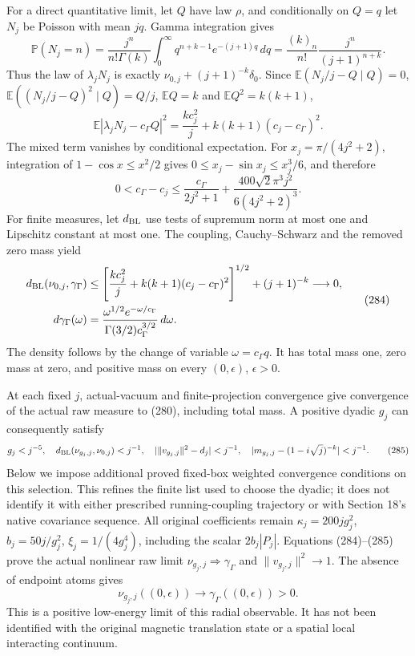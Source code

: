 \documentclass[
  11pt,
]{article}
\begin{document}
For a direct quantitative limit, let \(Q\) have law \(\rho\), and
conditionally on \(Q=q\) let \(N_j\) be Poisson with mean \(jq\). Gamma
integration gives \[
 {\mathbb P}(N_j=n)
 =\frac{j^n}{n!\Gamma(k)}
   \int_0^\infty q^{n+k-1}e^{-(j+1)q}\,dq
 =\frac{(k)_n}{n!}\frac{j^n}{(j+1)^{n+k}}.
 \tag{281}
\] Thus the law of \(\lambda_jN_j\) is exactly
\(\nu_{0,j}+(j+1)^{-k}\delta_0\). Since
\({\mathbb E}(N_j/j-Q\mid Q)=0\),
\({\mathbb E}((N_j/j-Q)^2\mid Q)=Q/j\), \({\mathbb E}Q=k\) and
\({\mathbb E}Q^2=k(k+1)\), \[
 {\mathbb E}|\lambda_jN_j-c_\Gamma Q|^2
 =\frac{kc_j^2}{j}+k(k+1)(c_j-c_\Gamma)^2.
 \tag{282}
\] The mixed term vanishes by conditional expectation. For
\(x_j=\pi/(4j^2+2)\), integration of \(1-\cos x\le x^2/2\) gives
\(0\le x_j-\sin x_j\le x_j^3/6\), and therefore \[
 0<c_\Gamma-c_j\le
 \frac{c_\Gamma}{2j^2+1}
 +\frac{400\sqrt2\pi^3j^2}{6(4j^2+2)^3}.
 \tag{283}
\] For finite measures, let \(d_{\rm BL}\) use tests of supremum norm at
most one and Lipschitz constant at most one. The coupling,
Cauchy--Schwarz and the removed zero mass yield \[
 \begin{split}
 d_{\rm BL}(\nu_{0,j},\gamma_\Gamma)
 &\le
 \left[\frac{kc_j^2}{j}
       +k(k+1)(c_j-c_\Gamma)^2\right]^{1/2}+(j+1)^{-k}
 \longrightarrow0,\\
 d\gamma_\Gamma(\omega)
 &=\frac{\omega^{1/2}e^{-\omega/c_\Gamma}}
       {\Gamma(3/2)c_\Gamma^{3/2}}\,d\omega .
 \end{split}
 \tag{284}
\] The density follows by the change of variable \(\omega=c_\Gamma q\).
It has total mass one, zero mass at zero, and positive mass on every
\((0,\epsilon)\), \(\epsilon>0\).

At each fixed \(j\), actual-vacuum and finite-projection convergence
give convergence of the actual raw measure to (280), including total
mass. A positive dyadic \(g_j\) can consequently satisfy \[
 g_j<j^{-5},\quad
 d_{\rm BL}(\nu_{g_j,j},\nu_{0,j})<j^{-1},\quad
 |\|v_{g_j,j}\|^2-d_j|<j^{-1},\quad
 |m_{g_j,j}-(1-i\sqrt j)^{-k}|<j^{-1}.
 \tag{285}
\] Below we impose additional proved fixed-box weighted convergence
conditions on this selection. This refines the finite list used to
choose the dyadic; it does not identify it with either prescribed
running-coupling trajectory or with Section 18's native covariance
sequence. All original coefficients remain \(\kappa_j=200jg_j^2\),
\(b_j=50j/g_j^2\), \(\xi_j=1/(4g_j^4)\), including the scalar
\(2b_j|P_j|\). Equations (284)--(285) prove the actual nonlinear raw
limit \(\nu_{g_j,j}\Rightarrow\gamma_\Gamma\) and
\(\|v_{g_j,j}\|^2\to1\). The absence of endpoint atoms gives \[
 \nu_{g_j,j}((0,\epsilon))
 \longrightarrow\gamma_\Gamma((0,\epsilon))>0 .
 \tag{286}
\] This is a positive low-energy limit of this radial observable. It has
not been identified with the original magnetic translation state or a
spatial local interacting continuum.
\end{document}
